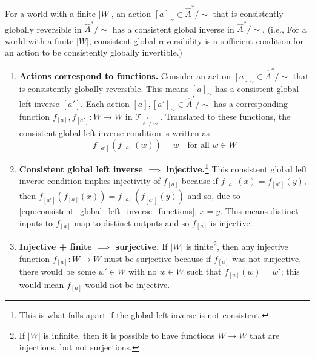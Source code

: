 \begin{propositionE}
    For a world with a finite $|W|$, an action $[a]_{\sim} \in \hat{A}^{*}/\sim$ that is consistently globally reversible in $\hat{A}^{*}/\sim$ has a consistent global inverse in $\hat{A}^{*}/\sim$.
    (i.e., For a world with a finite $|W|$, consistent global reversibility is a sufficient condition for an action to be consistently globally invertible.)
\end{propositionE}
\begin{proofE}
    \begin{enumerate}
    \item \textbf{Actions correspond to functions.}
    Consider an action $[a]_{\sim} \in \hat{A}^{*}/\sim$ that is consistently globally reversible.
    This means $[a]_{\sim}$ has a consistent global left inverse $[a']$.
    Each action $[a], [a']_{\sim} \in \hat{A}^{*}/\sim$ has a corresponding function $f_{[a]}, f_{[a']}: W \to W$ in $\mathcal{T}_{\hat{A}^{*}/\sim}$.
    Translated to these functions, the consistent global left inverse condition is written as
    \begin{equation}
        \label{eqn:consistent_global_left_inverse_functions}
        f_{[a']}(f_{[a]}(w)) = w \quad \text{for all $w \in W$}
    \end{equation}

    \item \textbf{Consistent global left inverse $\implies$ injective.\footnote{This is what falls apart if the global left inverse is not consistent.}}
    This consistent global left inverse condition implies injectivity of $f_{[a]}$ because if $f_{[a]}(x) = f_{[a']}(y)$, then $f_{[a']}(f_{[a]}(x)) = f_{[a]}(f_{[a']}(y))$ and so, due to \cref{eqn:consistent_global_left_inverse_functions}, $x = y$.
    This means distinct inputs to $f_{[a]}$ map to distinct outputs and so $f_{[a]}$ is injective.

    \item \textbf{Injective + finite $\implies$ surjective.}
    If $|W|$ is finite\footnote{
    If $|W|$ is infinite, then it is possible to have functions $W \to W$ that are injections, but not surjections. 
    }, then any injective function $f_{[a]}: W \to W$ must be surjective because if $f_{[a]}$ was not surjective, there would be some $w' \in W$ with no $w \in W$ such that $f_{[a]}(w) = w'$; this would mean $f_{[a]}$ would not be injective.


\end{enumerate}
\end{proofE}
